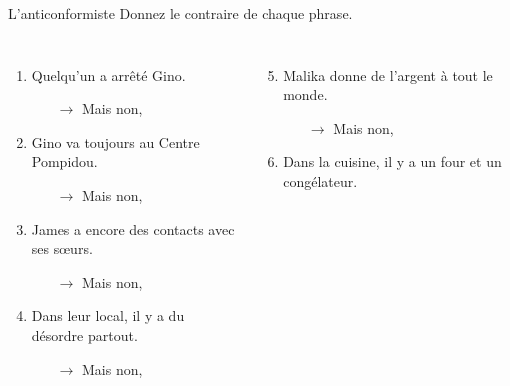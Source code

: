 \begin{frame}{L'anticonformiste}
  \footnotesize
  Donnez le contraire de chaque phrase.
  \begin{columns}[t]
      \begin{enumerate}
        \item \alert{Quelqu'un} a arrêté Gino.
        \begin{itemize}
          \scriptsize
          \item[$\to$] Mais non, 
        \end{itemize}
        \item Gino va \alert{toujours} au Centre Pompidou.
        \begin{itemize}
          \scriptsize
          \item[$\to$] Mais non, 
        \end{itemize}
        \item James a \alert{encore} des contacts avec ses sœurs.
        \begin{itemize}
          \scriptsize
          \item[$\to$] Mais non, 
        \end{itemize}
        \item Dans leur local, il y a du désordre \alert{partout}.
        \begin{itemize}
          \scriptsize
          \item[$\to$] Mais non, 
        \end{itemize}
      \end{enumerate}
      \begin{enumerate}
        \setcounter{enumi}{4}
        \item Malika donne de l'argent à \alert{tout le monde}.
        \begin{itemize}
          \scriptsize
          \item[$\to$] Mais non, 
        \end{itemize}
        \item Dans la cuisine, il y a \alert{un four et un congélateur}.

\end{enumerate}
\end{columns}
\end{frame}
